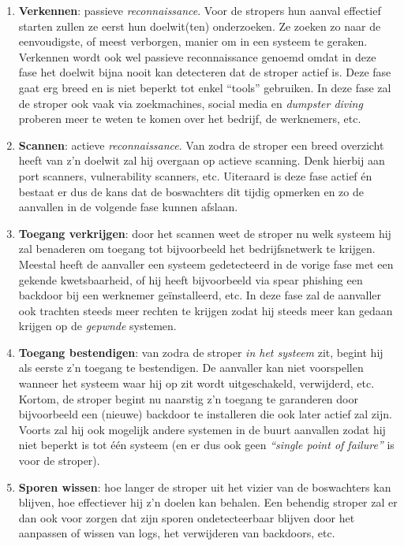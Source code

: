 \documentclass[
  10pt,
  dutch,
  paper=a4,
  ,captions=tableheading
]{scrbook}
\providecommand{\tightlist}{%
  \setlength{\itemsep}{0pt}\setlength{\parskip}{0pt}}
\begin{document}
\begin{enumerate}
\def\labelenumi{\arabic{enumi}.}
\tightlist
\item
  \textbf{Verkennen}: passieve \emph{reconnaissance}. Voor de stropers
  hun aanval effectief starten zullen ze eerst hun doelwit(ten)
  onderzoeken. Ze zoeken zo naar de eenvoudigste, of meest verborgen,
  manier om in een systeem te geraken. Verkennen wordt ook wel passieve
  reconnaissance genoemd omdat in deze fase het doelwit bijna nooit kan
  detecteren dat de stroper actief is. Deze fase gaat erg breed en is
  niet beperkt tot enkel ``tools'' gebruiken. In deze fase zal de
  stroper ook vaak via zoekmachines, social media en \emph{dumpster
  diving} proberen meer te weten te komen over het bedrijf, de
  werknemers, etc.
\item
  \textbf{Scannen}: actieve \emph{reconnaissance}. Van zodra de stroper
  een breed overzicht heeft van z'n doelwit zal hij overgaan op actieve
  scanning. Denk hierbij aan port scanners, vulnerability scanners, etc.
  Uiteraard is deze fase actief én bestaat er dus de kans dat de
  boswachters dit tijdig opmerken en zo de aanvallen in de volgende fase
  kunnen afslaan.
\item
  \textbf{Toegang verkrijgen}: door het scannen weet de stroper nu welk
  systeem hij zal benaderen om toegang tot bijvoorbeeld het
  bedrijfsnetwerk te krijgen. Meestal heeft de aanvaller een systeem
  gedetecteerd in de vorige fase met een gekende kwetsbaarheid, of hij
  heeft bijvoorbeeld via spear phishing een backdoor bij een werknemer
  geïnstalleerd, etc. In deze fase zal de aanvaller ook trachten steeds
  meer rechten te krijgen zodat hij steeds meer kan gedaan krijgen op de
  \emph{gepwnde} systemen.
\item
  \textbf{Toegang bestendigen}: van zodra de stroper \emph{in het
  systeem} zit, begint hij als eerste z'n toegang te bestendigen. De
  aanvaller kan niet voorspellen wanneer het systeem waar hij op zit
  wordt uitgeschakeld, verwijderd, etc. Kortom, de stroper begint nu
  naarstig z'n toegang te garanderen door bijvoorbeeld een (nieuwe)
  backdoor te installeren die ook later actief zal zijn. Voorts zal hij
  ook mogelijk andere systemen in de buurt aanvallen zodat hij niet
  beperkt is tot één systeem (en er dus ook geen \emph{``single point of
  failure''} is voor de stroper).
\item
  \textbf{Sporen wissen}: hoe langer de stroper uit het vizier van de
  boswachters kan blijven, hoe effectiever hij z'n doelen kan behalen.
  Een behendig stroper zal er dan ook voor zorgen dat zijn sporen
  ondetecteerbaar blijven door het aanpassen of wissen van logs, het
  verwijderen van backdoors, etc.
\end{enumerate}
\end{document}
